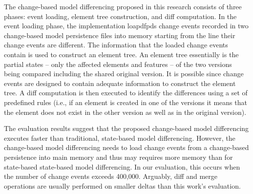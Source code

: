 The change-based model differencing proposed in this research consists of three phases: event loading, element tree construction, and diff computation. In the event loading phase, the implementation loapdfpds change events recorded in two change-based model persistence files into memory starting from the line their change events are different. The information that the loaded change events contain is used to construct an element tree. An element tree essentially is the partial states -- only the affected elements and features -- of the two versions being compared including the shared original version. It is possible since change events are designed to contain adequate information to construct the element tree. A diff computation is then executed to identify the differences using a set of predefined rules (i.e., if an element is created in one of the versions it means that the element does not exist in the other version as well as in the original version).

The evaluation results suggest that the proposed change-based model differencing executes faster than traditional, state-based model differencing.
However, the change-based model differencing needs to load change events from a change-based persistence into main memory and thus may requires more memory than for state-based state-based model differencing. In our evaluation, this occurs when the number of change events exceeds 400,000. Arguably, diff and merge operations are usually performed on smaller deltas than this work's evaluation.


